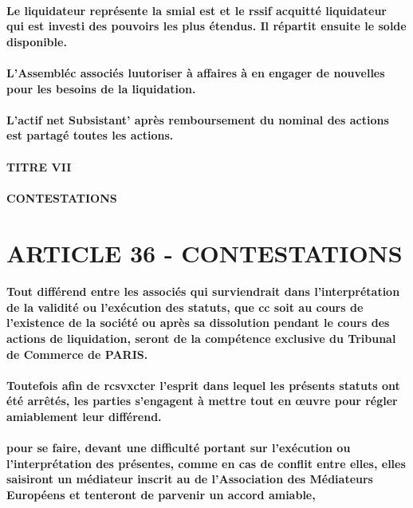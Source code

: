 \documentclass[a4paper, 11pt]{article}
\begin{document}
\paragraph{
  Le liquidateur représente la smial est et le rssif acquitté liquidateur qui est investi des pouvoirs les plus étendus. Il répartit ensuite le solde disponible.
}
\paragraph{
  L'Assembléc associés luutoriser à affaires à en engager de nouvelles pour les besoins de la liquidation.
}
\paragraph{
  L'actif net Subsistant' après remboursement du nominal des actions est partagé toutes les actions.
}

\paragraph{
  TITRE VII\\
  \\
  CONTESTATIONS
}
\section*{ARTICLE 36 - CONTESTATIONS}

\paragraph{
  Tout différend entre les associés qui surviendrait dans l'interprétation de la validité ou l'exécution des statuts, que cc soit au cours de l'existence de la société ou après sa dissolution pendant le cours des actions de liquidation, seront de la compétence exclusive du Tribunal de Commerce de PARIS.
}

\paragraph{
  Toutefois afin de rcsvxcter l'esprit dans lequel les présents statuts ont été arrêtés, les parties s'engagent à mettre tout en œuvre pour régler amiablement leur différend.
}

\paragraph{
  pour se faire, devant une difficulté portant sur l'exécution ou l'interprétation des présentes, comme en cas de conflit entre elles, elles saisiront un médiateur inscrit au de l'Association des Médiateurs Européens et tenteront de parvenir un accord amiable,
}
\end{document}
